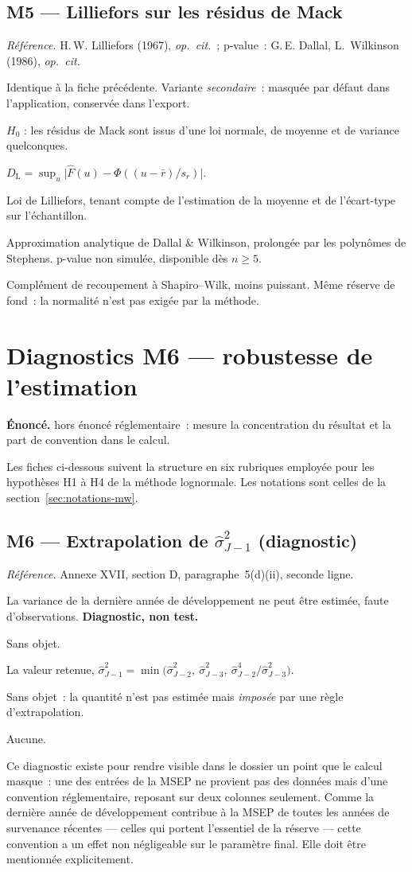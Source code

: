 \documentclass[a4paper,11pt]{article}
\newcommand{\refl}[1]{{\small\textcolor{maincolor!70!black}{\textit{Référence.} #1}}\par\smallskip}
\newcounter{ficheid}
\newenvironment{fiche}[1]{%
  \stepcounter{ficheid}%
  \phantomsection
  \subsection{#1}%
  \label{fiche:\theficheid}%
}{%
  \end{description}\vspace{0.5em}%
}
\newcommand{\Cadre}{%
  \begin{description}[leftmargin=0pt, style=unboxed, itemsep=3pt, topsep=3pt, parsep=2pt]%
  \item[\textcolor{financeblue}{\textbf{1. Cadre, notations et hypothèses de validité (non testées).}}]}
\newcommand{\Hzero}{\item[\textcolor{financeblue}{\textbf{2. Hypothèse nulle.}}]}
\newcommand{\Stat}{\item[\textcolor{financeblue}{\textbf{3. Statistique de test.}}]}
\newcommand{\Loi}{\item[\textcolor{financeblue}{\textbf{4. Loi sous $H_0$.}}]}
\newcommand{\Pval}{\item[\textcolor{financeblue}{\textbf{5. p-value.}}]}
\newcommand{\Usage}{\item[\textcolor{financeblue}{\textbf{6. Usage et limites.}}]}
\begin{document}
\begin{fiche}{M5 --- Lilliefors sur les résidus de Mack}
\label{mw:m5li}
\refl{H.\,W. Lilliefors (1967), \emph{op.\ cit.}~; p-value~: G.\,E. Dallal,
L.~Wilkinson (1986), \emph{op.\ cit.}}
\Cadre
Identique à la fiche précédente. Variante \emph{secondaire}~: masquée par défaut
dans l'application, conservée dans l'export.
\Hzero
$H_0$ : les résidus de Mack sont issus d'une loi normale, de moyenne et de
variance quelconques.
\Stat
$D_{\mathrm{L}} = \sup_u \big|\hat F(u) - \Phi((u - \bar r)/s_r)\big|$.
\Loi
Loi de Lilliefors, tenant compte de l'estimation de la moyenne et de
l'écart-type sur l'échantillon.
\Pval
Approximation analytique de Dallal \& Wilkinson, prolongée par les polynômes de
Stephens. p-value non simulée, disponible dès $n \ge 5$.
\Usage
Complément de recoupement à Shapiro--Wilk, moins puissant. Même réserve de fond~:
la normalité n'est pas exigée par la méthode.
\end{fiche}

\clearpage
\section{Diagnostics M6 --- robustesse de l'estimation}
\label{sec:mwm6}

\begin{encadre}
\textbf{Énoncé.} hors énoncé réglementaire~: mesure la concentration du résultat et la part de convention dans le calcul.
\end{encadre}

Les fiches ci-dessous suivent la structure en six rubriques employée pour les
hypothèses H1 à H4 de la méthode lognormale. Les notations sont celles de la
section~\ref{sec:notations-mw}.

\begin{fiche}{M6 --- Extrapolation de $\hat\sigma^2_{J-1}$ (diagnostic)}
\label{mw:m6sig}
\refl{Annexe XVII, section D, paragraphe~5(d)(ii), seconde ligne.}
\Cadre
La variance de la dernière année de développement ne peut être estimée, faute
d'observations. \textbf{Diagnostic, non test.}
\Hzero
Sans objet.
\Stat
La valeur retenue,
$\hat\sigma^2_{J-1} = \min\big(\hat\sigma^2_{J-2},\ \hat\sigma^2_{J-3},\
\hat\sigma^4_{J-2}/\hat\sigma^2_{J-3}\big)$.
\Loi
Sans objet~: la quantité n'est pas estimée mais \emph{imposée} par une règle
d'extrapolation.
\Pval
Aucune.
\Usage
Ce diagnostic existe pour rendre visible dans le dossier un point que le calcul
masque~: une des entrées de la MSEP ne provient pas des données mais d'une
convention réglementaire, reposant sur deux colonnes seulement. Comme la
dernière année de développement contribue à la MSEP de toutes les années de
survenance récentes --- celles qui portent l'essentiel de la réserve --- cette
convention a un effet non négligeable sur le paramètre final. Elle doit être
mentionnée explicitement.
\end{fiche}
\end{document}
